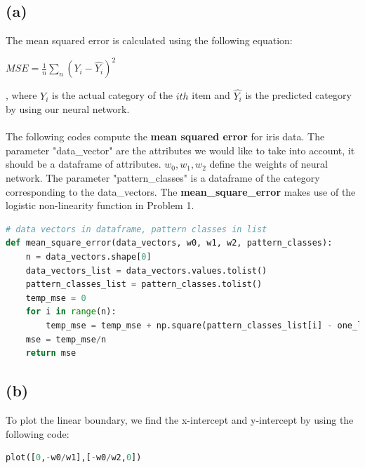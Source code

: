 \documentclass[12pt]{article}
\begin{document}
\subsection*{(a)}
The mean squared error is calculated using the following equation: 
\begin{center}
    $MSE = \frac{1}{n}\sum_n (Y_i - \hat{Y_i})^2$
\end{center}
, where $Y_i$ is the actual category of the $ith$ item and $\hat{Y_i}$ is the predicted category by using our neural network.\\ \\
The following codes compute the \textbf{mean squared error} for iris data. The parameter "data\_vector" are the attributes we would like to take into account, it should be a dataframe of attributes.
$w_0, w_1, w_2$ define the weights of neural network. The parameter "pattern\_classes" is a dataframe of the category corresponding to the data\_vectors. The \textbf{mean\_square\_error} makes use of 
the logistic non-linearity function in Problem 1.
\begin{lstlisting}[language=Python, caption=Mean Squared Error Calculation]
# data vectors in dataframe, pattern classes in list
def mean_square_error(data_vectors, w0, w1, w2, pattern_classes):
    n = data_vectors.shape[0]
    data_vectors_list = data_vectors.values.tolist()
    pattern_classes_list = pattern_classes.tolist()
    temp_mse = 0
    for i in range(n):
        temp_mse = temp_mse + np.square(pattern_classes_list[i] - one_layer_network(w0, w1, w2, data_vectors_list[i][0], data_vectors_list[i][1]))
    mse = temp_mse/n
    return mse
\end{lstlisting}

\subsection*{(b)}
To plot the linear boundary, we find the x-intercept and y-intercept by using the following code: 
\begin{lstlisting}[language=Python, caption=Plot Mean Squared Error]
plot([0,-w0/w1],[-w0/w2,0])
\end{lstlisting}
\end{document}

